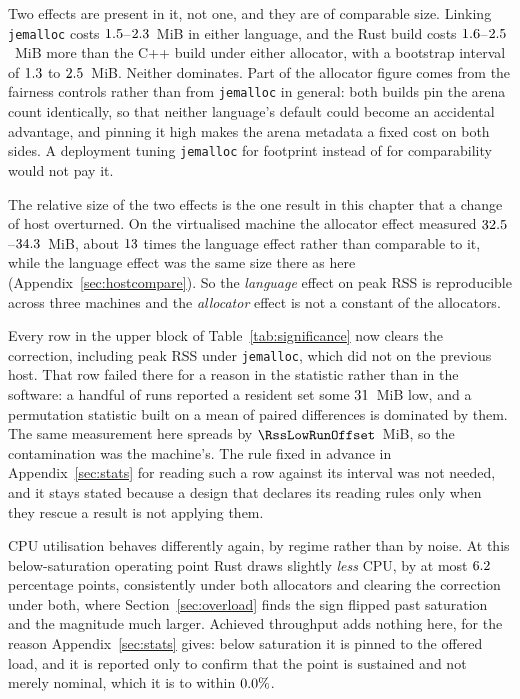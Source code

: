 \documentclass[english,oneside,a4paper,censored,csm,software-track-2020]{HYthesisML}
\begin{document}
Two effects are present in it, not one, and they are of comparable size. Linking \texttt{jemalloc}
costs $1.5$--$2.3$~MiB in either language, and the Rust build costs
$1.6$--$2.5$~MiB more than the C++ build under either allocator, with a
bootstrap interval of $1.3$ to $2.5$~MiB. Neither dominates. Part of the
allocator figure comes from the fairness controls rather than from \texttt{jemalloc} in general:
both builds pin the arena count identically, so that neither language's default could become an
accidental advantage, and pinning it high makes the arena metadata a fixed cost on both sides. A
deployment tuning \texttt{jemalloc} for footprint instead of for comparability would not pay it.

The relative size of the two effects is the one result in this chapter that a change of host
overturned. On the virtualised machine the allocator effect measured
$32.5$--$34.3$~MiB, about $13$ times the language
effect rather than comparable to it, while the language effect was the same size there as here
(Appendix~\ref{sec:hostcompare}). So the \emph{language} effect on peak RSS is reproducible across
three machines and the \emph{allocator} effect is not a constant of the allocators.

Every row in the upper block of Table~\ref{tab:significance} now clears the correction, including
peak RSS under \texttt{jemalloc}, which did not on the previous host. That row failed there for a
reason in the statistic rather than in the software: a handful of runs reported a resident set some
$31$~MiB low, and a permutation statistic built on a mean of paired differences
is dominated by them. The same measurement here spreads by $\RssLowRunOffset$~MiB, so the
contamination was the machine's. The rule fixed in advance in Appendix~\ref{sec:stats} for reading
such a row against its interval was not needed, and it stays stated because a design that declares
its reading rules only when they rescue a result is not applying them.

CPU utilisation behaves differently again, by regime rather than by noise. At this
below-saturation operating point Rust draws slightly \emph{less} CPU, by at most
$6.2$ percentage points, consistently under both allocators and clearing the correction
under both, where Section~\ref{sec:overload} finds the sign flipped past saturation and the
magnitude much larger. Achieved throughput adds nothing here, for the reason
Appendix~\ref{sec:stats} gives: below saturation it is pinned to the offered load, and it is
reported only to confirm that the point is sustained and not merely nominal, which it is to within
$0.0\%$.
\end{document}
